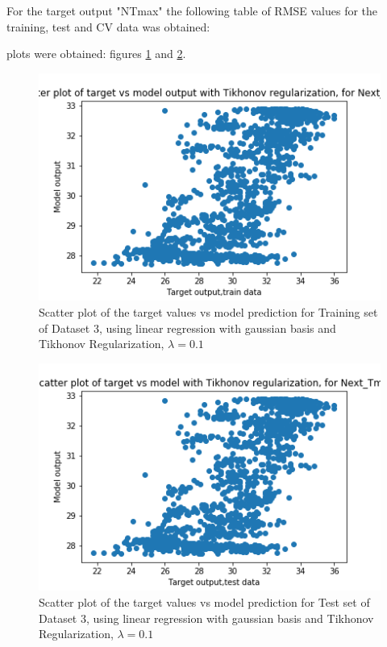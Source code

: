 \documentclass[12pt,a4paper]{article}
\begin{document}
 For the target output "NTmax" the following table of RMSE values for the training, test and CV data was obtained:

 plots were obtained: figures \ref{fig:tikhds3tr2} and \ref{fig:tikhds3t2}.
\begin{figure}[H]
     \centering
     \includegraphics[scale=0.5]{images/scatter_ds3tikhtrainT_max.png}
     \caption{Scatter plot of the target values vs model prediction for Training set of Dataset 3, using linear regression with gaussian basis and Tikhonov Regularization, $\lambda = 0.1 $}
     \label{fig:tikhds3tr2}
\end{figure}
\begin{figure}[H]
     \centering
     \includegraphics[scale=0.5]{images/scatter_ds3tikhtestT_max.png}
     \caption{Scatter plot of the target values vs model prediction for Test set of Dataset 3, using linear regression with gaussian basis and Tikhonov Regularization, $\lambda = 0.1 $}
     \label{fig:tikhds3t2}
\end{figure}

% 
% 
\end{document}
